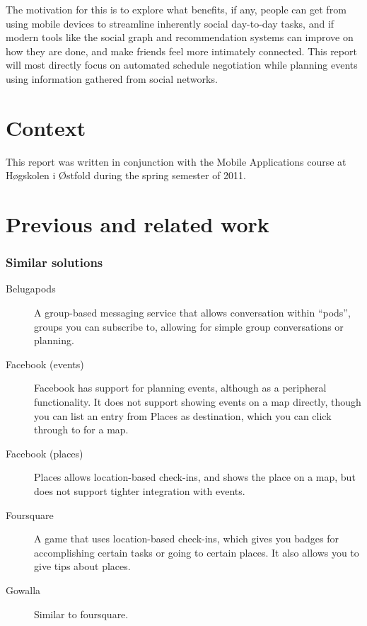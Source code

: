 \documentclass[]{report}
\let\oldmarginpar\marginpar
\renewcommand\marginpar[1]{\-\oldmarginpar[\raggedleft\footnotesize #1]%
{\raggedright\footnotesize #1}}
\begin{document}
The motivation for this is to explore what benefits, if any, people can get from
using mobile devices to streamline inherently social day-to-day tasks, and if
modern tools like the social graph and recommendation systems can improve on how
they are done, and make friends feel more intimately connected. This report will
most directly focus on automated schedule negotiation while planning events
using information gathered from social networks.

\section{Context}
This report was written in conjunction with the Mobile Applications course at
H\o{}gskolen i \O{}stfold\cite{site:mobapp} during the spring semester of 2011.

\section{Previous and related work}

\subsubsection{Similar solutions}

\begin{description}
\item[Belugapods] A group-based messaging service that allows conversation
  within ``pods'', groups you can subscribe to, allowing for simple group
  conversations or planning.\cite{site:belugapods}
\item[Facebook (events)] Facebook has support for planning events, although as a
  peripheral functionality. It does not support showing events on a map
  directly, though you can list an entry from Places as destination, which you
  can click through to for a map.\cite{site:facebook}
\item[Facebook (places)] Places allows location-based check-ins, and shows the
  place on a map, but does not support tighter integration with events.\cite{site:facebook}
\item[Foursquare] A game that uses location-based check-ins, which gives you
  badges for accomplishing certain tasks or going to certain places. It also
  allows you to give tips about places.\cite{site:foursquare}
\item[Gowalla] Similar to foursquare.\cite{site:gowalla}\marginpar{Fill out more here}
\end{description}
\end{document}
